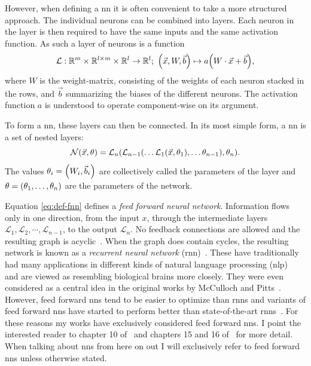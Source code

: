 However, when defining a \acrshort{nn} it is often convenient to take a more structured approach. The individual neurons can be combined into layers. Each neuron in the layer is then required to have the same inputs and the same activation function. As such a layer of neurons is a function
\begin{equation}\label{eq:def-layer}
\mathcal{L}: {\mathbb{R}}^m\times{\mathbb{R}}^{l\times m}\times{\mathbb{R}}^l\to{\mathbb{R}}^l;\ {\left( \vec{x}, W, \vec{b} \right)}\mapsto a{\left( W\cdot \vec{x} + \vec{b} \right)},
\end{equation}
where $W$ is the weight-matrix, consisting of the weights of each neuron stacked in the rows, and $\vec{b}$ summarizing the biases of the different neurons. The activation function $a$ is understood to operate component-wise on its argument.

To form a \acrshort{nn}, these layers can then be connected. In its most simple form, a \acrshort{nn} is a set of nested layers:
\begin{equation}\label{eq:def-fnn}
\mathcal{N}{\left( \vec{x}, \theta \right)} = \mathcal{L}_n{\left( \mathcal{L}_{n-1}{\left( \dots \mathcal{L}_1{\left( \vec{x}, \theta_1 \right)},\dots \theta_{n-1} \right)}, \theta_n \right)}.
\end{equation}
The values $\theta_i = {\left( W_i, \vec{b}_i \right)}$ are collectively called the parameters of the layer and $\theta={\left( \theta_1, \dotsc, \theta_n \right)}$ are the parameters of the network.

Equation \eqref{eq:def-fnn} defines a \emph{feed forward neural network}. Information flows only in one direction, from the input $x$, through the intermediate layers $\mathcal{L}_1, \mathcal{L}_2, \cdots, \mathcal{L}_{n-1}$, to the output $\mathcal{L}_n$. No feedback connections are allowed and the resulting graph is acyclic~\cite{Goodfellow:2016:DNN}. When the graph does contain cycles, the resulting network is known as a \emph{recurrent neural network} (\acrshort{rnn})~\cite{Rumelhart:1986aaa, Elman:1990aaa}. These have traditionally had many applications in different kinds of natural language processing (\acrshort{nlp})~\cite{Yin:2017aaa} and are viewed as resembling biological brains more closely. They were even considered as a central idea in the original works by McCulloch and Pitts~\cite{McCulloch:1943, Piccinini:2004}. However, feed forward \acrshort{nn}s tend to be easier to optimize than \acrshort{rnn}s and variants of feed forward \acrshort{nn}s have started to perform better than state-of-the-art \acrshort{rnn}s~\cite{Vaswani:2017aaa, Tunstall:2022aaa}. For these reasons my works have exclusively considered feed forward \acrshort{nn}s. I point the interested reader to chapter 10 of~\cite{Goodfellow:2016:DNN} and chapters 15 and 16 of~\cite{Geron:2017aaa} for more detail. When talking about \acrshort{nn}s from here on out I will exclusively refer to feed forward \acrshort{nn}s unless otherwise stated.

